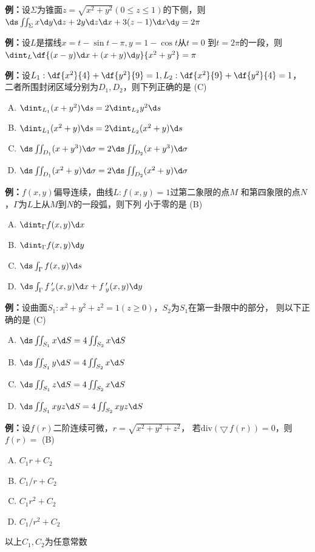{\bf 例：}设$\Sigma$为锥面$z=\sqrt{x^2+y^2}(0\leq z\leq 1)$的下侧，则
$\ds\iint_{\Sigma}x\d y\d z+2y\d z\d x+3(z-1)\d x\d y=2\pi$

{\bf 例：}设$L$是摆线$x=t-\sin t-\pi,y=1-\cos t$从$t=0$
到$t=2\pi$的一段，则$\dint_L\df{(x-y)\d x+(x+y)\d y}{x^2+y^2}=\pi$

{\bf 例：}设$L_1:\df{x^2}{4}+\df{y^2}{9}=1,L_2:\df{x^2}{9}+\df{y^2}{4}=1$，
二者所围封闭区域分别为$D_1,D_2$，则下列正确的是\;
(C)
\begin{enumerate}[(A)]
  \item $\dint_{L_1}(x+y^2)\d s=2\dint_{L_2}y^2\d s$
  \item $\dint_{L_1}(x^2+y)\d s=2\dint_{L_2}(x^2+y)\d s$
  \item $\ds\iint_{D_1}(x+y^3)\d\sigma=2\ds\iint_{D_2}(x+y^3)\d\sigma$
  \item $\ds\iint_{D_1}(x^2+y)\d\sigma=2\ds\iint_{D_2}(x^2+y)\d\sigma$
\end{enumerate}

{\bf 例：}$f(x,y)$偏导连续，曲线$L:f(x,y)=1$过第二象限的点$M$
  和第四象限的点$N$，$\Gamma$为$L$上从$M$到$N$的一段弧，则下列
  小于零的是\;
(B)
  \begin{enumerate}[(A)]
  \setlength{\itemindent}{1cm}
    \item $\dint_{\Gamma}f(x,y)\d x$
    \item $\dint_{\Gamma}f(x,y)\d y$
    \item $\ds\int_{\Gamma}f(x,y)\d s$
    \item $\ds\int_{\Gamma}f\,'_x(x,y)\d x+f\,'_y(x,y)\d y$
  \end{enumerate}

{\bf 例：}设曲面$S_1:x^2+y^2+z^2=1(z\geq
  0)$，$S_2$为$S_1$在第一卦限中的部分，
  则以下正确的是\;
  (C) 
  \begin{enumerate}[(A)]
  \setlength{\itemindent}{1cm}
    \item $\ds\iint_{S_1}x\d S=4\iint_{S_2}x\d S$
    \item $\ds\iint_{S_1}y\d S=4\iint_{S_2}x\d S$
    \item $\ds\iint_{S_1}z\d S=4\iint_{S_2}x\d S$
    \item $\ds\iint_{S_1}xyz\d S=4\iint_{S_2}xyz\d S$
  \end{enumerate}

{\bf 例：}设$f(r)$二阶连续可微，$r=\sqrt{x^2+y^2+z^2}$，
  若$\mathrm{div}(\bigtriangledown\,f(r))=0$，则$f(r)=$\;
  (B) 
  \begin{enumerate}[(A)]
  \setlength{\itemindent}{1cm}
    \item $C_1r+C_2$
    \item $C_1/r+C_2$
    \item $C_1r^2+C_2$
    \item $C_1/r^2+C_2$
  \end{enumerate}
  以上$C_1,C_2$为任意常数

